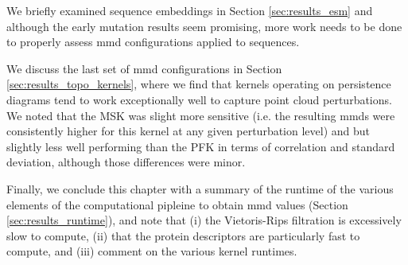 We briefly examined sequence embeddings in Section \ref{sec:results_esm} and
although the early mutation results seem promising, more work needs to be done
to properly assess \gls{mmd} configurations applied to sequences.

We discuss the last set of \gls{mmd} configurations in Section
\ref{sec:results_topo_kernels}, where we find that kernels operating on
persistence diagrams tend to work exceptionally well to capture point cloud
perturbations. We noted that the MSK was slight more sensitive (i.e. the
resulting \gls{mmd}s were consistently higher for this kernel at any given
perturbation level) and but slightly less well performing than the PFK in terms
of correlation and standard deviation, although those differences were minor.

Finally, we conclude this chapter with a summary of the runtime of the various
elements of the computational pipleine to obtain \gls{mmd} values (Section
\ref{sec:results_runtime}), and note that (i) the Vietoris-Rips filtration is
excessively slow to compute, (ii) that the protein descriptors are particularly
fast to compute, and (iii) comment on the various kernel runtimes.
